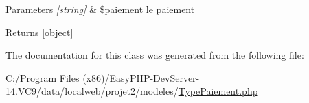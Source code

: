 \begin{DoxyParams}{Parameters}
{\em \mbox{[}string\mbox{]}} & \$paiement le paiement \\
\hline
\end{DoxyParams}
\begin{DoxyReturn}{Returns}
\mbox{[}object\mbox{]} 
\end{DoxyReturn}


The documentation for this class was generated from the following file\+:\begin{DoxyCompactItemize}
\item 
C\+:/\+Program Files (x86)/\+Easy\+P\+H\+P-\/\+Dev\+Server-\/14.\+V\+C9/data/localweb/projet2/modeles/\hyperlink{_type_paiement_8php}{Type\+Paiement.\+php}\end{DoxyCompactItemize}
